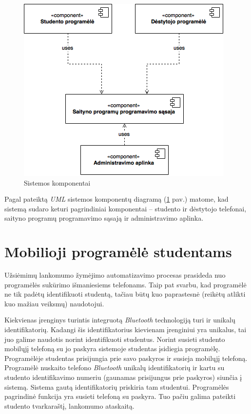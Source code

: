 \documentclass{VUMIFPSkursinis}
\begin{document}
\begin{figure}[H]
	\centering
	\includegraphics[scale=0.5]{img/kursinio_component}
	\caption{Sistemos komponentai}
	\label{img:componentDiagram}
\end{figure}

Pagal pateiktą \textit{UML} sistemos komponentų diagramą (\ref{img:componentDiagram} pav.) matome, kad sistemą sudaro keturi pagrindiniai komponentai – studento ir dėstytojo telefonai, saityno programų programavimo sąsają ir administravimo aplinka.

\section{Mobilioji programėlė studentams} \label{StudentApp}

Užsiėmimų lankomumo žymėjimo automatizavimo procesas prasideda nuo programėlės sukūrimo išmaniesiems telefonams. Taip pat svarbu, kad programėlė ne tik padėtų identifikuoti studentą, tačiau būtų kuo paprastesnė (reikėtų atlikti kuo mažiau veiksmų) naudotojui.

Kiekvienas įrenginys turintis integruotą \textit{Bluetooth} technologiją turi ir unikalų identifikatorių. Kadangi šis identifikatorius kievienam įrenginiui yra unikalus, tai juo galime naudotis norint identifikuoti studentus. Norint susieti studento mobilųjį telefoną su jo paskyra sistemoje studentas įsidiegia programėlę. Programėlėje studentas prisijungia prie savo paskyros ir susieja mobilųjį telefoną. Programėlė nuskaito telefono \textit{Bluetooth} unikalų identifikatorių ir kartu su studento identifikavimo numeriu (gaunamas prisijungus prie paskyros) siunčia į sistemą. Sistema gautą identifikatorių priskiria tam studentui. Programėlės pagrindinė funkcija yra susieti telefoną su paskyra. Tuo pačiu galima pateikti studento tvarkaraštį, lankomumo ataskaitą.
\end{document}
